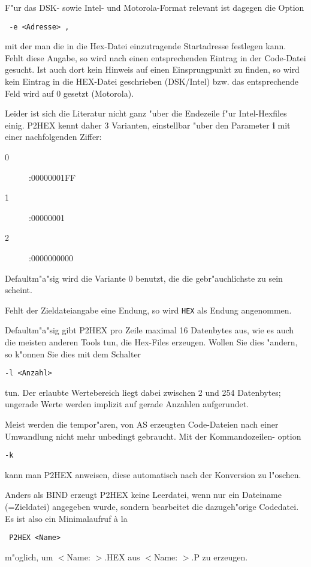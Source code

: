 \documentclass[12pt,a4paper,twoside]{report}
\newcommand{\bb}[1]{{\bf #1}}
\newcommand{\tty}[1]{{\tt #1}}
\begin{document}
{F"ur das DSK- sowie Intel- und Motorola-Format relevant ist dagegen
die Option
\begin{verbatim}
 -e <Adresse> ,
\end{verbatim}
mit der man die in die Hex-Datei einzutragende Startadresse festlegen
kann.  Fehlt diese Angabe, so wird nach einen entsprechenden Eintrag
in der Code-Datei gesucht.  Ist auch dort kein Hinweis auf einen
Einsprungpunkt zu finden, so wird kein Eintrag in die HEX-Datei 
geschrieben (DSK/Intel) bzw. das entsprechende Feld wird auf 0 gesetzt 
(Motorola).
\par
Leider ist sich die Literatur nicht ganz "uber die Endezeile f"ur
Intel-Hexfiles einig.  P2HEX kennt daher 3 Varianten, einstellbar "uber
den Parameter \bb{i} mit einer nachfolgenden Ziffer:
\begin{description}
\item[0]{ :00000001FF}
\item[1]{ :00000001}
\item[2]{ :0000000000}
\end{description}
\par
Defaultm"a"sig wird die Variante 0 benutzt, die die gebr"auchlichste zu
sein scheint.
\par
Fehlt der Zieldateiangabe eine Endung, so wird \tty{HEX} als Endung angenommen.
\par
Defaultm"a"sig gibt P2HEX pro Zeile maximal 16 Datenbytes aus, wie es
auch die meisten anderen Tools tun, die Hex-Files erzeugen.  Wollen
Sie dies "andern, so k"onnen Sie dies mit dem Schalter
\begin{verbatim}
-l <Anzahl>
\end{verbatim}
tun.  Der erlaubte Wertebereich liegt dabei zwischen 2 und 254 Datenbytes;
ungerade Werte werden implizit auf gerade Anzahlen aufgerundet.
\par
Meist werden die tempor"aren, von AS erzeugten Code-Dateien nach einer
Umwandlung nicht mehr unbedingt gebraucht.  Mit der Kommandozeilen-  
option 
\begin{verbatim}
-k
\end{verbatim}
kann man P2HEX anweisen, diese automatisch nach der Konversion zu l"oschen.
\par
Anders als BIND erzeugt P2HEX keine Leerdatei, wenn nur ein Dateiname
(=Zieldatei) angegeben wurde, sondern bearbeitet die dazugeh"orige
Codedatei.  Es ist also ein Minimalaufruf \`a la
\begin{verbatim}
 P2HEX <Name>
\end{verbatim}
m"oglich, um $<$Name:  $>$.HEX aus $<$Name:  $>$.P zu erzeugen.

}
\end{document}
